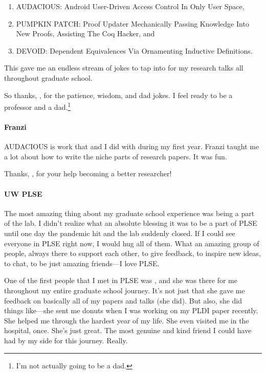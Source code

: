 \begin{enumerate}
\item \textsc{AUDACIOUS}: Android User-Driven Access Control In Only User Space,
\item \textsc{PUMPKIN PATCH}: Proof Updater Mechanically Passing Knowledge Into New Proofs, Assisting The Coq Hacker, and
\item \textsc{DEVOID}: Dependent Equivalences Via Ornamenting Inductive Definitions.
\end{enumerate}
This gave me an endless stream of jokes to tap into for my research talks all throughout graduate school.

So thanks, , for the patience, wisdom, and dad jokes. I feel ready to be a professor and a dad.\footnote{I'm not actually going to be a dad.}

\paragraph{Franzi}

\textsc{AUDACIOUS} is work that  and I did with  during my first year. Franzi taught me a lot about how to write the niche parts of research papers.
It was fun.

Thanks, , for your help becoming a better researcher!

\paragraph{UW PLSE}
The most amazing thing about my graduate school experience was being a part of the  lab.
I didn't realize what an absolute blessing it was to be a part of PLSE until one day the pandemic hit and the lab suddenly closed.
If I could see everyone in PLSE right now, I would hug all of them.
What an amazing group of people, always there to support each other,
to give feedback, to inspire new ideas, to chat,
to be just amazing friends---I love PLSE.

One of the first people that I met in PLSE was , and she was there for me throughout my entire graduate school journey.
It's not just that she gave me feedback on basically all of my papers and talks (she did).
But also, she did things like---she sent me donuts when I was working on my PLDI paper recently.
She helped me through the hardest year of my life.
She even visited me in the hospital, once.
She's just great.
The most genuine and kind friend I could have had by my side for this journey. Really.

